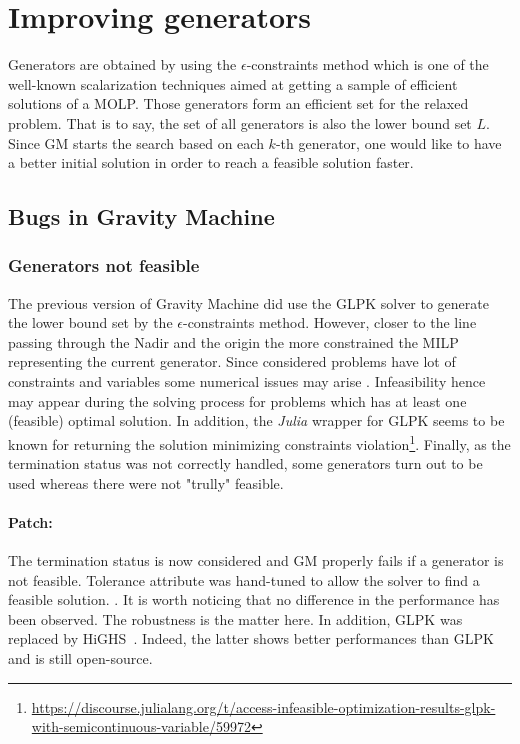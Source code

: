 \section{Improving generators}
Generators are obtained by using the $\epsilon$-constraints method which is one of the well-known scalarization techniques \cite{Chankong1983MultiobjectiveDM} aimed at getting a sample of efficient solutions of a MOLP. Those generators form an efficient set for the relaxed problem. That is to say, the set of all generators is also the lower bound set $L$. Since GM starts the search based on each $k$-th generator, one would like to have a better initial solution in order to reach a feasible solution faster.

\subsection{Bugs in Gravity Machine}

\subsubsection*{Generators not feasible}
The previous version of Gravity Machine did use the GLPK solver to generate the lower bound set by the $\epsilon$-constraints method. 
However, closer to the line passing through the Nadir and the origin the more constrained the MILP representing the current generator. 
Since considered problems have lot of constraints and variables some numerical issues may arise \cite{gurobiNumIssues}. Infeasibility hence
may appear during the solving process for problems which has at least one (feasible) optimal solution. In addition, the \textit{Julia} wrapper
for GLPK seems to be known for returning the solution minimizing constraints violation\footnote{\url{https://discourse.julialang.org/t/access-infeasible-optimization-results-glpk-with-semicontinuous-variable/59972}}.
Finally, as the termination status was not correctly handled, some generators turn out to be used whereas there were not "trully" feasible.
\paragraph*{Patch:}
The termination status is now considered and GM properly fails if a generator is not feasible. 
Tolerance attribute was hand-tuned to allow the solver to find a feasible solution. .
It is worth noticing that no difference in the performance has been observed. The robustness is the matter here.
In addition, GLPK was replaced by HiGHS~\cite{highs}. Indeed, the latter shows better performances than GLPK~\cite{bench_solver} and is still open-source.

